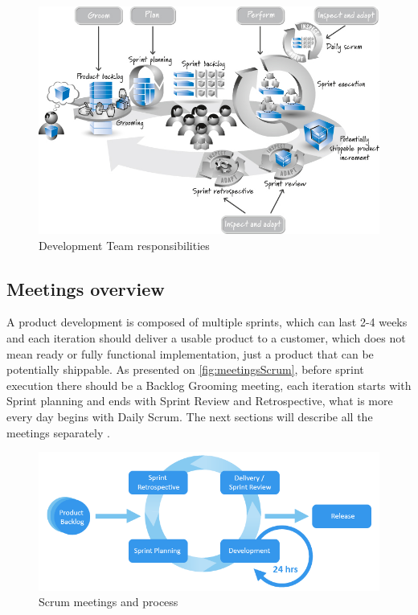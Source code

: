 \begin{figure}[h]
\caption{Development Team responsibilities \cite{ScrumBook}}
\label{fig:devtRes}
\centering
\includegraphics[width=1\textwidth]{img/developmentRes}
\end{figure}

\subsection{Meetings overview}
\label{chap:meetingsOverview}

A product development is composed of multiple sprints, which can last 2-4 weeks \cite{ScrumBook} and each iteration should deliver a usable product to a customer, which does not mean ready or fully functional implementation, just a product that can be potentially shippable. As presented on \autoref{fig:meetingsScrum}, before sprint execution there should be a Backlog Grooming meeting, each iteration starts with Sprint planning and ends with Sprint Review and Retrospective, what is more every day begins with Daily Scrum. The next sections will describe all the meetings separately \cite{ScrumBook}. 

\begin{figure}[h]
\caption{Scrum meetings and process}
\label{fig:meetingsScrum}
\centering
\includegraphics[width=1\textwidth]{img/agile-graphic}
\end{figure}

